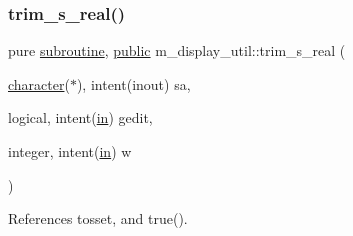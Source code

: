 \subsubsection{\texorpdfstring{trim\+\_\+s\+\_\+real()}{trim\_s\_real()}}
{\footnotesize\ttfamily pure \hyperlink{M__stopwatch_83_8txt_acfbcff50169d691ff02d4a123ed70482}{subroutine}, \hyperlink{M__stopwatch_83_8txt_a2f74811300c361e53b430611a7d1769f}{public} m\+\_\+display\+\_\+util\+::trim\+\_\+s\+\_\+real (\begin{DoxyParamCaption}\item[{\hyperlink{option__stopwatch_83_8txt_abd4b21fbbd175834027b5224bfe97e66}{character}($\ast$), intent(inout)}]{sa,  }\item[{logical, intent(\hyperlink{M__journal_83_8txt_afce72651d1eed785a2132bee863b2f38}{in})}]{gedit,  }\item[{integer, intent(\hyperlink{M__journal_83_8txt_afce72651d1eed785a2132bee863b2f38}{in})}]{w }\end{DoxyParamCaption})}



References tosset, and true().

